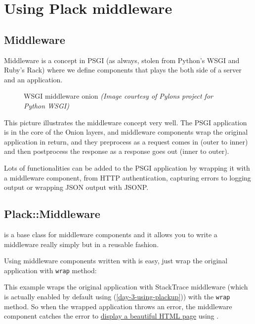\chapter{Using Plack middleware}\label{day-10-using-plack-middleware}

\section{Middleware}\label{middleware}

Middleware is a concept in PSGI (as always, stolen from Python's WSGI
and Ruby's Rack) where we define components that plays the both side of
a server and an application.

\begin{figure}[htbp]
\centering

\caption{WSGI middleware onion 
  \emph{(Image courtesy of Pylons project for Python WSGI)}}
\label{fig:onion}
\end{figure}

This picture illustrates the middleware concept very well. The PSGI
application is in the core of the Onion layers, and middleware
components wrap the original application in return, and they preprocess
as a request comes in (outer to inner) and then postprocess the response
as a response goes out (inner to outer).

Lots of functionalities can be added to the PSGI application by wrapping
it with a middleware component, from HTTP authentication, capturing
errors to logging output or wrapping JSON output with JSONP.

\section{Plack::Middleware}\label{plackmiddleware}

\href{http://search.cpan.org/perldoc?Plack::Middleware}{}
is a base class for middleware components and it allows you to write
a middleware really simply but in a reusable fashion.

Using middleware components written with  is easy, just
wrap the original application with \lstinline!wrap! method:


This example wraps the original application with StackTrace middleware
(which is actually enabled by default using  
(\autoref{day-3-using-plackup})) with the \lstinline!wrap! method. So when the
wrapped application throws an error, the middleware component catches
the error to
\href{http://bulknews.typepad.com/blog/2009/10/develstacktraceashtml.html}{display
a beautiful HTML page} using .

